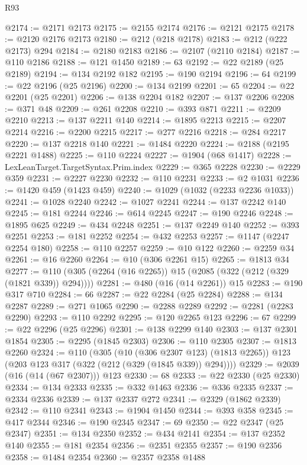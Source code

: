 \begin{lexlean}{R93}
\begin{coremodule}
@2174 := @2171 @2173
@2175 := @2155 @2174
@2176 := @2121 @2175
@2178 := @2120 @2176 @2173
@2180 := @212 (@218 @2178)
@2183 := @212 (@222 @2173) @294
@2184 := @2180 @2183
@2186 := @2107 (@2110 @2184)
@2187 := @110 @2186
@2188 := @121 @1450
@2189 := 63
@2192 := @22 @2189 (@25 @2189)
@2194 := @134 @2192 @182
@2195 := @190 @2194
@2196 := 64
@2199 := @22 @2196 (@25 @2196)
@2200 := @134 @2199
@2201 := 65
@2204 := @22 @2201 (@25 @2201)
@2206 := @138 @2204 @182
@2207 := @137 @2206
@2208 := @371 @48
@2209 := @261 @2208
@2210 := @393 @871
@2211 := @2209 @2210
@2213 := @137 @2211 @140
@2214 := @1895 @2213
@2215 := @2207 @2214
@2216 := @2200 @2215
@2217 := @277 @2216
@2218 := @284 @2217
@2220 := @137 @2218 @140
@2221 := @1484 @2220
@2224 := @2188 (@2195 @2221 @1488)
@2225 := @110 @2224
@2227 := @1904 (@68 @1417)
@2228 := LexLeanTarget.TargetSyntax.Prim.index
@2229 := @365 @2228
@2230 := @2229 @359
@2231 := @2227 @2230
@2232 := @110 @2231
@2233 := @2 @1031
@2236 := @1420 @459 (@1423 @459)
@2240 := @1029 (@1032 (@2233 @2236 @1033))
@2241 := @1028 @2240
@2242 := @1027 @2241
@2244 := @137 @2242 @140
@2245 := @181 @2244
@2246 := @614 @2245
@2247 := @190 @2246
@2248 := @1895 @625
@2249 := @434 @2248
@2251 := @137 @2249 @140
@2252 := @393 @2251
@2253 := @181 @2252
@2254 := @432 @2253
@2257 := @1147 (@2247 @2254 @180)
@2258 := @110 @2257
@2259 := @10 @122
@2260 := @2259 @34
@2261 := @16 @2260
@2264 := @10 (@306 @2261 @15)
@2265 := @1813 @34
@2277 := @110 (@305 (@2264 (@16 @2265)) @15 (@2085 (@322 (@212 (@329 (@1821 @339)) @294))))
@2281 := @480 (@16 (@14 @2261)) @15
@2283 := @190 @317 @710
@2284 := 66
@2287 := @22 @2284 (@25 @2284)
@2288 := @134 @2287
@2289 := @271 @1065
@2290 := @2288 @2289
@2292 := @2281 (@2283 @2290)
@2293 := @110 @2292
@2295 := @120 @2265 @123
@2296 := 67
@2299 := @22 @2296 (@25 @2296)
@2301 := @138 @2299 @140
@2303 := @137 @2301 @1854
@2305 := @2295 (@1845 @2303)
@2306 := @110 @2305
@2307 := @1813 @2260
@2324 := @110
    (@305
      (@10 (@306 @2307 @123) (@1813 @2265))
      @123
      (@203 @123 @317 (@322 (@212 (@329 (@1845 @339)) @294))))
@2329 := @2039 (@16 (@14 (@67 @2307))) @123
@2330 := 68
@2333 := @22 @2330 (@25 @2330)
@2334 := @134 @2333
@2335 := @332 @1463
@2336 := @336 @2335
@2337 := @2334 @2336
@2339 := @137 @2337 @272
@2341 := @2329 (@1862 @2339)
@2342 := @110 @2341
@2343 := @1904 @1450
@2344 := @393 @358
@2345 := @417 @2344
@2346 := @190 @2345
@2347 := 69
@2350 := @22 @2347 (@25 @2347)
@2351 := @134 @2350
@2352 := @434 @2141
@2354 := @137 @2352 @140
@2355 := @181 @2354
@2356 := @2351 @2355
@2357 := @190 @2356
@2358 := @1484 @2354
@2360 := @2357 @2358 @1488

\end{coremodule}
\end{lexlean}
